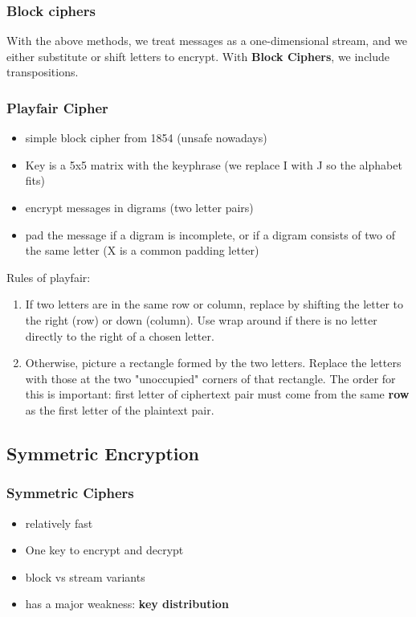 \documentclass{article}
\begin{document}
\subsubsection{Block ciphers}
With the above methods, we treat messages as a one-dimensional stream, and we either substitute or shift letters to encrypt. With \textbf{Block Ciphers}, we include transpositions.
\subsubsection{Playfair Cipher}
\begin{itemize}
    \item simple block cipher from 1854 (unsafe nowadays)
    \item Key is a 5x5 matrix with the keyphrase (we replace I with J so the alphabet fits)
    \item encrypt messages in digrams (two letter pairs)
    \item pad the message if a digram is incomplete, or if a digram consists of two of the same letter (X is a common padding letter)
\end{itemize}
Rules of playfair:
\begin{enumerate}
    \item If two letters are in the same row or column, replace by shifting the letter to the right (row) or down (column). Use wrap around if there is no letter directly to the right of a chosen letter.
    \item Otherwise, picture a rectangle formed by the two letters. Replace the letters with those at the two "unoccupied" corners of that rectangle. The order for this is important: first letter of ciphertext pair must come from the same \textbf{row} as the first letter of the plaintext pair.
\end{enumerate}


\subsection{Symmetric Encryption}
\subsubsection{Symmetric Ciphers}
\begin{itemize}
    \item relatively fast
    \item One key to encrypt and decrypt
    \item block vs stream variants
    \item has a major weakness: \textbf{key distribution}
\end{itemize}
\end{document}
